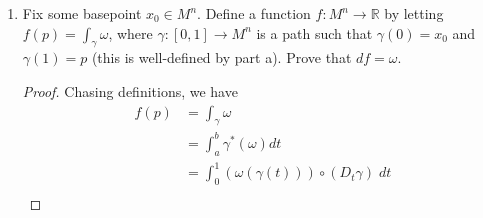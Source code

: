 \documentclass{article}
\begin{document}
\begin{enumerate}[label={\bf Q\arabic*:}]
\begin{enumerate}
\begin{proof}
          Then $\gamma$ is a smooth path, even at $t=1$, because from
          our choice of $h$, there will be an open interval containing
          $t=1$ where $\gamma$ is constant. Furthurmore, $\gamma$ is a
          closed path, so from assumption $\int_\gamma\omega=0$. Now
          \begin{align*}
            0 &=\int_\gamma\omega \\
              &=\int_{\gamma_1\circ h}\omega - \int_{\gamma_2\circ h}\omega
                \\
              &=\int_{\gamma_1}\omega - \int_{\gamma_2}\omega &(\text{from
                Question 1}), \\
          \end{align*}
          and so $\int_{\gamma_1}\omega=\int_{\gamma_2}\omega$ as required.
        \end{proof}

      \item Fix some basepoint $x_0\in M^n$. Define a function
        $f:M^n\rightarrow\mathbb{R}$ by letting $f(p)=\int_\gamma\omega$,
        where $\gamma:[0,1]\rightarrow M^n$ is a path such that
        $\gamma(0)=x_0$ and $\gamma(1)=p$ (this is well-defined by part a).
        Prove that $df=\omega$.

        \begin{proof}
          Chasing definitions, we have
          \begin{align*}
            f(p) &= \int_\gamma\omega \\
              &=\int_a^b\gamma^*(\omega)dt \\
              &=\int_0^1(\omega(\gamma(t))) \circ(D_t\gamma)\; dt \\
          \end{align*}
        \end{proof}
    \end{enumerate}
\end{enumerate}
\end{document}

